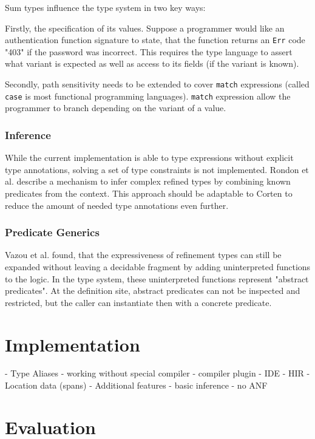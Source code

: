 \documentclass{book}
\newcommand{\code}[1]{\texttt{#1}}
\theoremstyle{definition}
\begin{document}
Sum types influence the type system in two key ways: 

Firstly, the specification of its values. Suppose a programmer would like an authentication function signature to state, that the function returns an \code{Err} code "403" if the password was incorrect. This requires the type language to assert what variant is expected as well as access to its fields (if the variant is known).

Secondly, path sensitivity needs to be extended to cover \code{match} expressions (called \code{case} is most functional programming languages). \code{match} expression allow the programmer to branch depending on the variant of a value.

\subsection{Inference}

While the current implementation is able to type expressions without explicit type annotations, solving a set of type constraints is not implemented. 
Rondon et al. \cite{rondon_liquid_2008} describe a mechanism to infer complex refined types by combining known predicates from the context. This approach should be adaptable to Corten to reduce the amount of needed type annotations even further.


\subsection{Predicate Generics}

Vazou et al. \cite{vazou_abstract_2013} found, that the expressiveness of refinement types can still be expanded without leaving a decidable fragment by adding uninterpreted functions to the logic. In the type system, these uninterpreted functions represent "abstract predicates". At the definition site, abstract predicates can not be inspected and restricted, but the caller can instantiate then with a concrete predicate.



\chapter{Implementation}


- Type Aliases
- working without special compiler
- compiler plugin
- IDE
- HIR
- Location data (spans)
- Additional features
  - basic inference
  - no ANF

\chapter{Evaluation}
\end{document}

